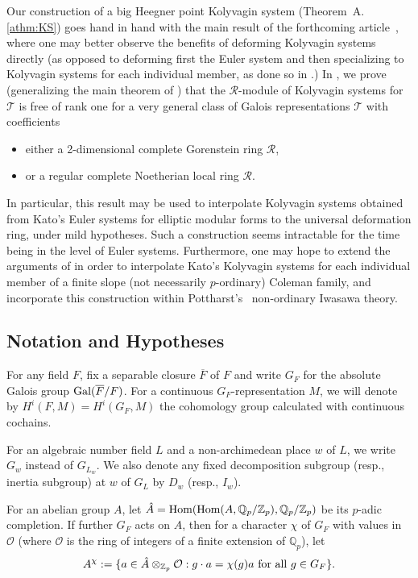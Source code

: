 \documentclass[12pt]{amsart}
\numberwithin{equation}{section}
\begin{document}
Our construction of a big Heegner point Kolyvagin system (Theorem~A.\ref{athm:KS}) goes hand in hand with the main result of the forthcoming article~\cite{kbbdeform}, where one may better observe the benefits of deforming Kolyvagin systems directly (as opposed to deforming first the Euler system and then specializing to Kolyvagin systems for each individual member, as done so in \cite{fouquetRIMS}.) In \cite{kbbdeform}, we prove (generalizing the main theorem of \cite{kbb}) that the ${\mathcal{R}}$-module of Kolyvagin systems for $\mathcal{T}$ is free of rank one for a very general class of Galois representations $\mathcal{T}$ with coefficients 
\begin{itemize}
\item either a 2-dimensional complete Gorenstein  ring ${\mathcal{R}}$, 
\item or a regular complete Noetherian local ring ${\mathcal{R}}$.
\end{itemize}
In particular, this result may be used to interpolate Kolyvagin systems obtained from Kato's Euler systems for elliptic modular forms to the universal deformation ring, under mild hypotheses. Such a construction seems intractable for the time being in the level of Euler systems. Furthermore, one may hope to extend the arguments of \cite{kbbdeform} in order to interpolate Kato's Kolyvagin systems for each individual member of a finite slope (not necessarily $p$-ordinary) Coleman family, and incorporate this construction within Pottharst's~\cite{pottharstSelmer} non-ordinary Iwasawa theory.

\subsection{Notation and Hypotheses}
\label{subsec:notationhypo} For any field $F$, fix a separable
closure $\overline{F}$ of $F$ and write $G_F$ for the absolute
Galois group $\textup{Gal}(\overline{F}/F)$. For a continuous
$G_F$-representation $M$, we will denote by $H^i(F,M)=H^i(G_F,M)$
the cohomology group calculated with continuous cochains.

For an algebraic number field $L$ and a non-archimedean place $w$ of $L$, we write $G_w$ instead of $G_{L_w}$. We also denote any fixed decomposition subgroup (resp., inertia subgroup) at $w$ of $G_L$ by $D_w$ (resp., $I_w$).

For an abelian group $A$, let
$\hat{A}=\textup{Hom}(\textup{Hom}(A,{\mathbb{Q}}_p/{\mathbb{Z}}_p),{\mathbb{Q}}_p/{\mathbb{Z}}_p)$ be
its $p$-adic completion. If further $G_F$ acts on $A$, then for a
character $\chi$ of $G_F$ with values in ${\mathcal{O}}$ (where ${\mathcal{O}}$ is the
ring of integers of a finite extension of ${\mathbb{Q}}_p$), let
$$A^\chi:=\{a \in \hat{A}\otimes_{{\mathbb{Z}}_p}{\mathcal{O}}: g\cdot a=\chi(g)a \hbox{ for all } g\in G_F\}.$$
\end{document}
